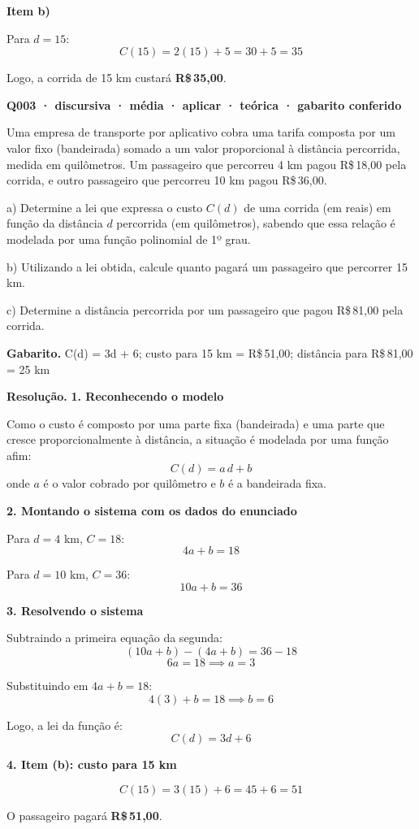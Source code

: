 \documentclass[11pt,a4paper]{article}
\begin{document}
\textbf{Item b)}

Para $d = 15$:
$$C(15) = 2(15) + 5 = 30 + 5 = 35$$

Logo, a corrida de 15 km custará \textbf{R\$\,35,00}.

\bigskip\noindent\textbf{Q003 · discursiva · média · aplicar · teórica · gabarito conferido}\par\nopagebreak
Uma empresa de transporte por aplicativo cobra uma tarifa composta por um valor fixo (bandeirada) somado a um valor proporcional à distância percorrida, medida em quilômetros. Um passageiro que percorreu 4 km pagou R\$\,18,00 pela corrida, e outro passageiro que percorreu 10 km pagou R\$\,36,00.

a) Determine a lei que expressa o custo $C(d)$ de uma corrida (em reais) em função da distância $d$ percorrida (em quilômetros), sabendo que essa relação é modelada por uma função polinomial de 1º grau.

b) Utilizando a lei obtida, calcule quanto pagará um passageiro que percorrer 15 km.

c) Determine a distância percorrida por um passageiro que pagou R\$\,81,00 pela corrida.

\textbf{Gabarito.} C(d) = 3d + 6; custo para 15 km = R\$\,51,00; distância para R\$\,81,00 = 25 km

\textbf{Resolução.} \textbf{1. Reconhecendo o modelo}

Como o custo é composto por uma parte fixa (bandeirada) e uma parte que cresce proporcionalmente à distância, a situação é modelada por uma função afim:
$$C(d) = a\,d + b$$
onde $a$ é o valor cobrado por quilômetro e $b$ é a bandeirada fixa.

\textbf{2. Montando o sistema com os dados do enunciado}

Para $d = 4$ km, $C = 18$:
$$4a + b = 18$$

Para $d = 10$ km, $C = 36$:
$$10a + b = 36$$

\textbf{3. Resolvendo o sistema}

Subtraindo a primeira equação da segunda:
$$(10a + b) - (4a + b) = 36 - 18$$
$$6a = 18 \implies a = 3$$

Substituindo em $4a + b = 18$:
$$4(3) + b = 18 \implies b = 6$$

Logo, a lei da função é:
$$C(d) = 3d + 6$$

\textbf{4. Item (b): custo para 15 km}

$$C(15) = 3(15) + 6 = 45 + 6 = 51$$

O passageiro pagará \textbf{R\$\,51,00}.
\end{document}
